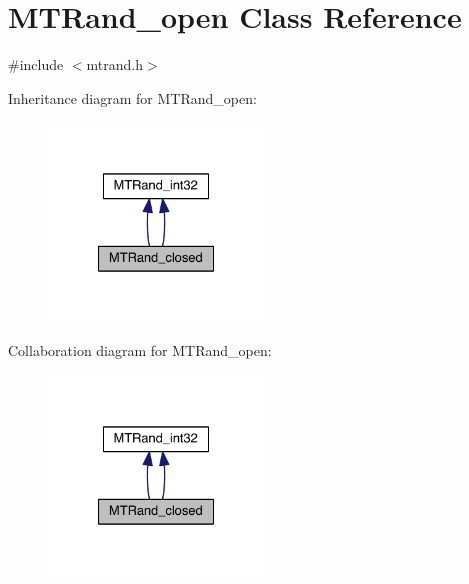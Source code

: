 \hypertarget{a00020}{\section{M\-T\-Rand\-\_\-open Class Reference}
\label{a00020}
}


{\ttfamily \#include $<$mtrand.\-h$>$}



Inheritance diagram for M\-T\-Rand\-\_\-open\-:
\nopagebreak
\begin{figure}[H]
\begin{center}
\leavevmode
\includegraphics[width=162pt]{a00221}
\end{center}
\end{figure}


Collaboration diagram for M\-T\-Rand\-\_\-open\-:
\nopagebreak
\begin{figure}[H]
\begin{center}
\leavevmode
\includegraphics[width=162pt]{a00222}
\end{center}
\end{figure}
